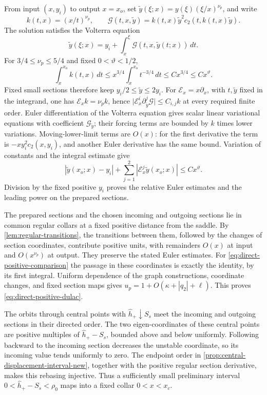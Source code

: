 From input \((x,y_i)\) to output \(x=x_o\), set
\(\tilde y(\xi;x)=y(\xi)(\xi/x)^{\nu_p}\), and write
\[
 k(t,x)=(x/t)^{\nu_p},\qquad
 \mathscr G(t,x,\tilde y)=k(t,x)\tilde y^2c_2(t,k(t,x)\tilde y).
\]
The solution satisfies the Volterra equation
\[
 \tilde y(\xi;x)=y_i+\int_x^\xi
           \mathscr G(t,x,\tilde y(t;x))\,dt .
\]
For \(3/4\le\nu_p\le5/4\) and fixed \(0<\vartheta<1/2\),
\[
 \int_x^{x_o}k(t,x)\,dt
 \le x^{3/4}\int_x^{x_o}t^{-3/4}\,dt
 \le Cx^{3/4}\le Cx^\vartheta .
\]
Fixed small sections therefore keep
\(y_i/2\le\tilde y\le2y_i\). For \(\mathcal E_x=x\partial_x\),
with \(t,\tilde y\) fixed in the integrand, one has
\(\mathcal E_xk=\nu_pk\), hence
\(\lvert\mathcal E_x^i\partial_{\tilde y}^j\mathscr G\rvert
\le C_{i,j}k\) at every required finite order. Euler differentiation
of the Volterra equation gives scalar linear variational equations
with coefficient \(\mathscr G_{\tilde y}\); their forcing terms are
bounded by \(k\) times lower variations. Moving-lower-limit terms
are \(O(x)\): for the first derivative the term is
\(-xy_i^2c_2(x,y_i)\), and another Euler derivative has the same bound.
Variation of constants and the integral estimate give
\[
 |\tilde y(x_o;x)-y_i|
       +\sum_{j=1}^2|\mathcal E_x^j\tilde y(x_o;x)|\le Cx^\vartheta.
\]
Division by the fixed positive \(y_i\) proves the relative Euler
estimates and the leading power on the prepared sections.

The prepared sections and the chosen incoming and outgoing sections
lie in common regular collars at a fixed positive distance from
the saddle. By \cref{lem:regular-transitions}, the transitions
between them, followed by the changes of section coordinates,
contribute positive units, with remainders \(O(x)\) at input and
\(O(x^{\nu_p})\) at output. They preserve the stated Euler estimates. For
\eqref{eq:direct-positive-comparison} the passage in these coordinates
is exactly the identity, by its first integral. Uniform dependence
of the graph constructions, coordinate changes, and fixed section
maps gives \(u_p=1+O(\kappa+|q_2|+\ell)\).
This proves \eqref{eq:direct-positive-dulac}.

The orbits through central points with \(\widehat h_+\downarrow S_s\)
meet the incoming and outgoing sections in their directed order. The
two eigen-coordinates of these central points are positive multiples
of \(\widehat h_+-S_s\), bounded above and below uniformly. Following
backward to the incoming section decreases the unstable coordinate,
so its incoming value tends uniformly to zero. The endpoint order in
\cref{prop:central-displacement-interval-new}, together with the
positive regular section derivative, makes this rebasing injective.
Thus a sufficiently small preliminary interval
\(0<\widehat h_+-S_s<\rho_0\) maps into a fixed collar \(0<x<x_c\).

